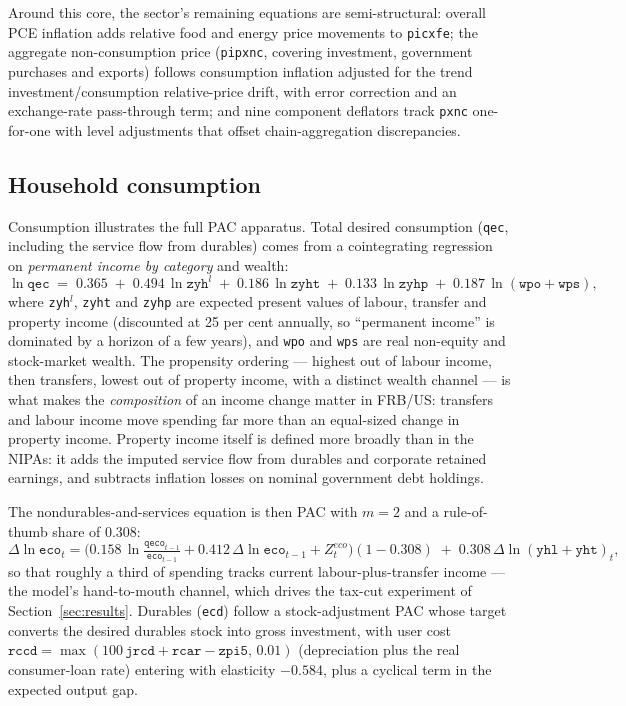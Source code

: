 Around this core, the sector's remaining equations are semi-structural: overall PCE inflation adds relative food and energy price movements to \texttt{picxfe}; the aggregate non-consumption price (\texttt{pipxnc}, covering investment, government purchases and exports) follows consumption inflation adjusted for the trend investment/consumption relative-price drift, with error correction and an exchange-rate pass-through term; and nine component deflators track \texttt{pxnc} one-for-one with level adjustments that offset chain-aggregation discrepancies.

\subsection{Household consumption}
\label{sec:consumption}

Consumption illustrates the full PAC apparatus. Total desired consumption (\texttt{qec}, including the service flow from durables) comes from a cointegrating regression on \emph{permanent income by category} and wealth:
\begin{equation}
\ln \texttt{qec} \;=\; 0.365 \;+\; 0.494\,\ln \texttt{zyh}^{l} \;+\; 0.186\,\ln \texttt{zyht} \;+\; 0.133\,\ln \texttt{zyhp} \;+\; 0.187\,\ln(\texttt{wpo}+\texttt{wps}),
\label{eq:qec}
\end{equation}
where \texttt{zyh}$^l$, \texttt{zyht} and \texttt{zyhp} are expected present values of labour, transfer and property income (discounted at 25 per cent annually, so ``permanent income'' is dominated by a horizon of a few years), and \texttt{wpo} and \texttt{wps} are real non-equity and stock-market wealth. The propensity ordering --- highest out of labour income, then transfers, lowest out of property income, with a distinct wealth channel --- is what makes the \emph{composition} of an income change matter in FRB/US: transfers and labour income move spending far more than an equal-sized change in property income. Property income itself is defined more broadly than in the NIPAs: it adds the imputed service flow from durables and corporate retained earnings, and subtracts inflation losses on nominal government debt holdings.

The nondurables-and-services equation is then PAC with $m=2$ and a rule-of-thumb share of 0.308:
\begin{equation}
\Delta\ln \texttt{eco}_t = \big(0.158\,\ln\tfrac{\texttt{qeco}_{t-1}}{\texttt{eco}_{t-1}} + 0.412\,\Delta\ln \texttt{eco}_{t-1} + Z^{eco}_t\big)(1-0.308) \;+\; 0.308\,\Delta\ln(\texttt{yhl}+\texttt{yht})_t,
\label{eq:eco}
\end{equation}
so that roughly a third of spending tracks current labour-plus-transfer income --- the model's hand-to-mouth channel, which drives the tax-cut experiment of Section~\ref{sec:results}. Durables (\texttt{ecd}) follow a stock-adjustment PAC whose target converts the desired durables stock into gross investment, with user cost $\texttt{rccd}=\max(100\,\texttt{jrcd}+\texttt{rcar}-\texttt{zpi5},\,0.01)$ (depreciation plus the real consumer-loan rate) entering with elasticity $-0.584$, plus a cyclical term in the expected output gap.

